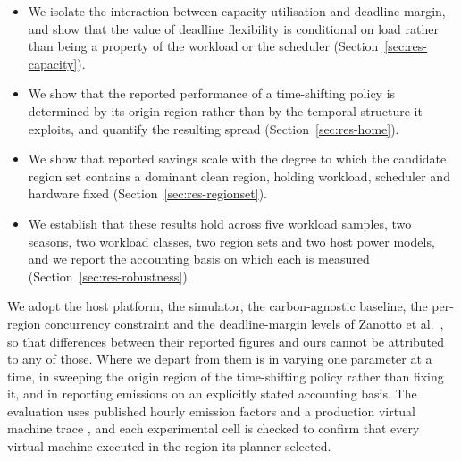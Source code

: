 \begin{itemize}
\item We isolate the interaction between capacity utilisation and deadline
      margin, and show that the value of deadline flexibility is conditional on
      load rather than being a property of the workload or the scheduler
      (Section~\ref{sec:res-capacity}).
\item We show that the reported performance of a time-shifting policy is
      determined by its origin region rather than by the temporal structure it
      exploits, and quantify the resulting spread
      (Section~\ref{sec:res-home}).
\item We show that reported savings scale with the degree to which the candidate
      region set contains a dominant clean region, holding workload, scheduler
      and hardware fixed (Section~\ref{sec:res-regionset}).
\item We establish that these results hold across five workload samples, two
      seasons, two workload classes, two region sets and two host power models,
      and we report the accounting basis on which each is measured
      (Section~\ref{sec:res-robustness}).
\end{itemize}

We adopt the host platform, the simulator, the carbon-agnostic baseline, the
per-region concurrency constraint and the deadline-margin levels of Zanotto et
al.~\cite{zanotto2025usercentric}, so that differences between their reported
figures and ours cannot be attributed to any of those. Where we depart from them
is in varying one parameter at a time, in sweeping the origin region of the
time-shifting policy rather than fixing it, and in reporting emissions on an
explicitly stated accounting basis. The evaluation
uses published hourly emission factors \cite{maji2022carboncast} and a
production virtual machine trace \cite{cortez2017resourcecentral}, and each
experimental cell is checked to confirm that every virtual machine executed in
the region its planner selected.
